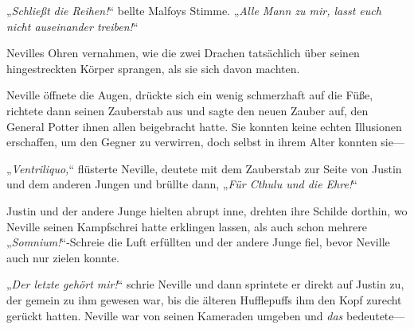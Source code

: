 „\emph{Schließt die Reihen!}“ bellte Malfoys Stimme. „\emph{Alle Mann zu mir, lasst euch nicht auseinander treiben!}“

Nevilles Ohren vernahmen, wie die zwei Drachen tatsächlich über seinen hingestreckten Körper sprangen, als sie sich davon machten.

Neville öffnete die Augen, drückte sich ein wenig schmerzhaft auf die Füße, richtete dann seinen Zauberstab aus und sagte den neuen Zauber auf, den General Potter ihnen allen beigebracht hatte. Sie konnten keine echten Illusionen erschaffen, um den Gegner zu verwirren, doch selbst in ihrem Alter konnten sie—

„\emph{Ventriliquo,}“%
flüsterte Neville, deutete mit dem Zauberstab zur Seite von Justin und dem anderen Jungen und brüllte dann, „\emph{Für Cthulu und die Ehre!}“

Justin und der andere Junge hielten abrupt inne, drehten ihre Schilde dorthin, wo Neville seinen Kampfschrei hatte erklingen lassen, als auch schon mehrere „\emph{Somnium!}“-Schreie die Luft erfüllten und der andere Junge fiel, bevor Neville auch nur zielen konnte.

„\emph{Der letzte gehört mir!}“ schrie Neville und dann sprintete er direkt auf Justin zu, der gemein zu ihm gewesen war, bis die älteren Hufflepuffs ihm den Kopf zurecht gerückt hatten. Neville war von seinen Kameraden umgeben und \emph{das} bedeutete—

